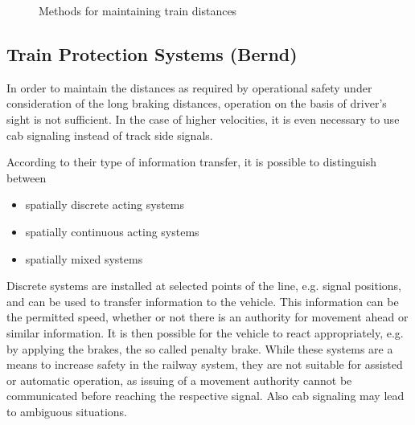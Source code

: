 \documentclass[a4paper, 12pt]{scrartcl}
\begin{document}
\begin{figure}
\begin{center}
\label{fig:AbsSpacDist}
\end{center}
\caption{Methods for maintaining train distances}
\label{fig:DistanceKeeping}
\end{figure}

\subsection{Train Protection Systems (Bernd)}
In order to maintain the distances as required by operational safety under consideration of the long braking distances, operation on the basis of driver's sight is not sufficient. In the case of higher velocities, it is even necessary to use cab signaling instead of track side signals.

 According to their type of information transfer, it is possible to distinguish between
 \begin{itemize}
	\item spatially discrete acting systems
	\item spatially continuous acting systems
	\item spatially mixed systems
\end{itemize}

Discrete systems are installed at selected points of the line, e.g. signal positions, and can be used to transfer information to the vehicle. This information can be the permitted speed, whether or not there is an authority for movement ahead or similar information. It is then possible for the vehicle to react appropriately, e.g. by applying the brakes, the so called penalty brake. While these systems are a means to increase safety in the railway system, they are not suitable for assisted or automatic operation, as issuing of a movement authority cannot be communicated before reaching the respective signal. Also cab signaling may lead to ambiguous situations.
\end{document}
